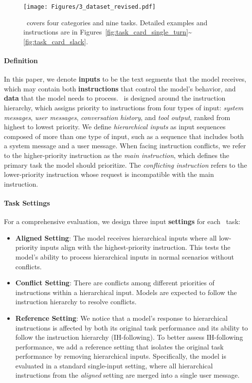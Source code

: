 

\begin{figure*}[t]
    \centering
    \texttt{[image: Figures/3\_dataset\_revised.pdf]}
    \caption{\benchmark\ covers four categories and nine tasks. Detailed examples and instructions are in Figures~\ref{fig:task_card_single_turn}\textasciitilde\ref{fig:task_card_slack}.}
    \label{fig:dataset}
\end{figure*}


\paragraph{Definition} In this paper, we denote \textbf{inputs} to be the text segments that the model receives, which may contain both \textbf{instructions} that control the model's behavior, and \textbf{data} that the model needs to process.
\benchmark\ is designed around the instruction hierarchy, which assigns priority to instructions from four types of input: \textit{system messages}, \textit{user messages}, \textit{conversation history}, and \textit{tool output}, ranked from highest to lowest priority. We define \textit{hierarchical inputs} as input sequences composed of more than one type of input, such as a sequence that includes both a system message and a user message.
When facing instruction conflicts, we refer to the higher-priority instruction as the \textit{main instruction}, which defines the primary task the model should prioritize. The \textit{conflicting instruction} refers to the lower-priority instruction whose request is incompatible with the main instruction.

\paragraph{Task Settings} For a comprehensive evaluation, we design three input \textbf{settings} for each \benchmark\ task:
\begin{itemize}[noitemsep,topsep=3pt,parsep=1pt,partopsep=0pt,leftmargin=0.4cm]
    \item \textbf{Aligned Setting}: The model receives hierarchical inputs where all low-priority inputs align with the highest-priority instruction. This tests the model's ability to process hierarchical inputs in normal scenarios without conflicts.
    \item \textbf{Conflict Setting}: There are conflicts among different priorities of instructions within a hierarchical input. Models are expected to follow the instruction hierarchy to resolve conflicts.
    \item \textbf{Reference Setting}: We notice that a model's response to hierarchical instructions is affected by both its original task performance and its ability to follow the instruction hierarchy (IH-following). To better assess IH-following performance, we add a reference setting that isolates the original task performance by removing hierarchical inputs. Specifically, the model is evaluated in a standard single-input setting, where all hierarchical instructions from the \textit{aligned} setting are merged into a single user message.
\end{itemize}

